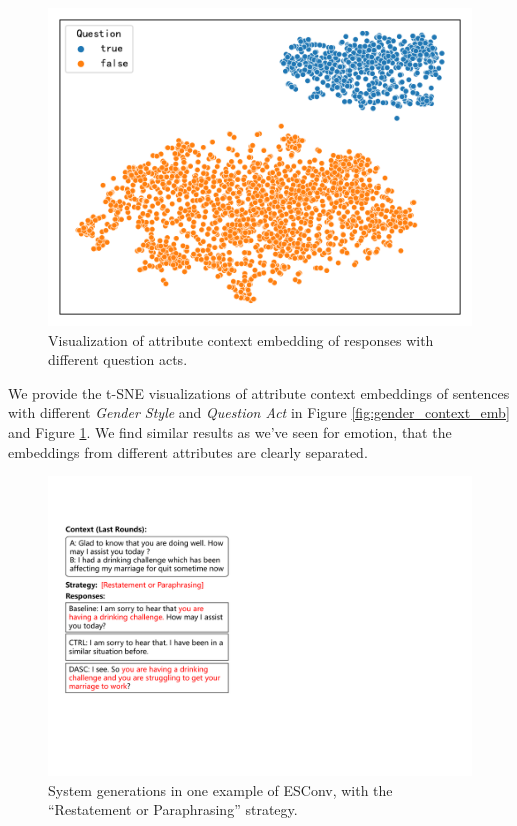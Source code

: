 \begin{figure}[ht]
    \centering
    \includegraphics[width=1.0\columnwidth]{figures/question_context_emb.pdf}
    \caption{Visualization of attribute context embedding of responses with different question acts.}
    \label{fig:question_context_emb}
\end{figure}

We provide the t-SNE visualizations of attribute context embeddings of sentences with different \textit{Gender Style} and \textit{Question Act} in Figure \ref{fig:gender_context_emb} and Figure \ref{fig:question_context_emb}. We find similar results as we've seen for emotion, that the embeddings from different attributes are clearly separated.

\begin{figure}[htbp]
    \centering
    \includegraphics[width=1.0\columnwidth]{figures/esconv_example1.pdf}
    \caption{System generations in one example of ESConv, with the ``Restatement or Paraphrasing'' strategy.}
    \label{fig:esconv_example1}
\end{figure}


